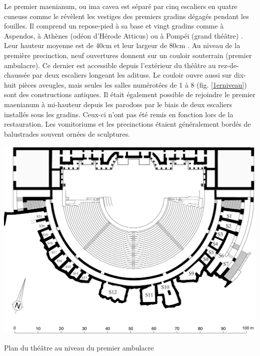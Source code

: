 		Le premier \gls{maenianum}, ou \gls{ima cavea} est séparé par cinq escaliers en quatre \glspl{cuneus} comme le révèlent les vestiges des premiers gradins dégagés pendant les fouilles. Il comprend un repose-pied à sa base et vingt gradins comme à Aspendos, à Athènes (odéon d'Hérode Atticus) ou à Pompéi (grand théâtre) \citep[p. 34]{formige}. Leur hauteur moyenne est de 40cm et leur largeur de 80cm \cite[p. 31]{formige}. Au niveau de la première \gls{precinction}, neuf ouvertures donnent  sur un couloir souterrain (premier \gls{ambulacre}). Ce dernier est accessible depuis l'extérieur du théâtre au rez-de-chaussée par deux escaliers longeant les \glspl{aditus}. Le couloir ouvre aussi sur dix-huit pièces aveugles, mais seules les salles numérotées de 1 à 8 (fig. \ref{1erniveau}) sont des constructions antiques. Il était également possible de rejoindre le premier \gls{maenianum} à mi-hauteur depuis les \glspl{parodos} par le biais de deux escaliers installés sous les gradins. Ceux-ci n'ont pas été remis en fonction lors de la restauration. Les \glspl{vomitorium} et les \glspl{precinction} étaient généralement bordés de balustrades souvent ornées de sculptures.
		
	\begin{figureth}
		\includegraphics[width=\linewidth]{images/1erniveau}
		\caption[Vue de dessus - 1er niveau]{Plan du théâtre au niveau du premier \gls{ambulacre} \footnotemark }
		\label{1erniveau}
	\end{figureth}		
	
